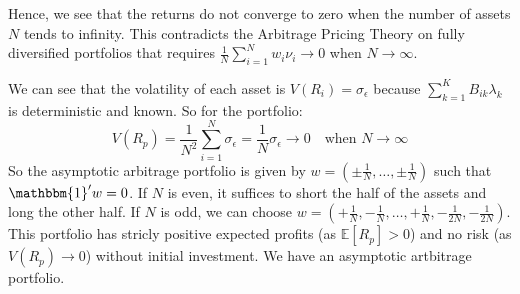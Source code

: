 \documentclass[10pt]{article}
\newcommand{\Ebb}{\mathbb{E}}
\newenvironment{exercise}[2][Exercise]{\begin{trivlist}
  \item[\hskip \labelsep {\bfseries #1}\hskip \labelsep {\bfseries #2.}]}{\end{trivlist}}
\begin{document}
\begin{exercise}{1}
\begin{itemize}
    Hence, we see that the returns do not converge to zero when the number of assets $N$ tends to infinity. This contradicts the Arbitrage Pricing Theory on fully diversified portfolios that requires $ \frac{1}{N}\sum_{i=1}^Nw_i\nu_i \rightarrow 0$ when $N \rightarrow \infty$.  

    We can see that the volatility of each asset is $V(R_i) = \sigma_{\epsilon}$ because $\sum_{k=1}^KB_{ik}\lambda_k$ is deterministic and known. 
    So for the portfolio: 
    $$ V(R_p) = \frac{1}{N^2}\sum_{i=1}^N\sigma_{\epsilon} = \frac{1}{N}\sigma_\epsilon \rightarrow 0 \quad \text{when } N \rightarrow \infty$$
    So the asymptotic arbitrage portfolio is given by $w = (\pm\frac{1}{N},\dots,\pm\frac{1}{N})$ such that $\mathbbm{1}'w = 0$. If $N$ is even, it suffices to short the half of the assets and long the other half. If $N$ is odd, we can choose $w = (+\frac{1}{N},-\frac{1}{N},\dots,+\frac{1}{N},-\frac{1}{2N},-\frac{1}{2N})$.
    This portfolio has stricly positive expected profits (as $\Ebb[R_p] > 0$) and no risk (as $V(R_p)\rightarrow 0$) without initial investment. We have an asymptotic artbitrage portfolio. 
  \end{itemize}
	
\end{exercise}
  
\end{document}
